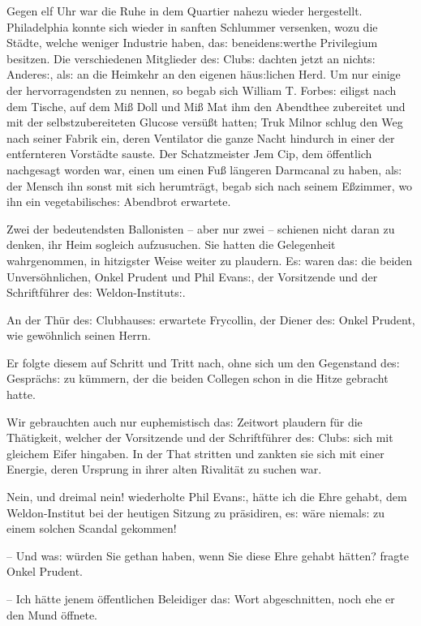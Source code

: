 \documentclass[oneside,12pt]{book}
\newcommand{\s}{s:}
\begin{document}
Gegen elf Uhr war die Ruhe in dem Quartier nahezu wieder hergestellt.
Philadelphia konnte sich wieder in sanften Schlummer versenken, wozu
die St\"adte, welche weniger Industrie haben, da{\s}
beneiden{\s}werthe Privilegium besitzen. Die verschiedenen Mitglieder
de{\s} Club{\s} dachten jetzt an nicht{\s} Andere{\s}, al{\s} an die
Heimkehr an den eigenen h\"au{\s}lichen Herd. Um nur einige der
hervorragendsten zu nennen, so begab sich William T. Forbe{\s}
eiligst nach dem Tische, auf dem Mi{\ss} Doll und Mi{\ss} Mat ihm den
Abendthee zubereitet und mit der selbst\/zubereiteten Glucose
vers\"u{\ss}t hatten; Truk Milnor schlug den Weg nach seiner Fabrik
ein, deren Ventilator die ganze Nacht hindurch in einer der
entfernteren Vorst\"adte sauste. Der Schatzmeister Jem Cip, dem
\"offentlich nachgesagt worden war, einen um einen Fu{\ss} l\"angeren
Darmcanal zu haben, al{\s} der Mensch ihn sonst mit sich
herumtr\"agt, begab sich nach seinem E{\ss}zimmer, wo ihn ein
vegetabilische{\s} Abendbrot erwartete.

Zwei der bedeutendsten Ballonisten -- aber nur zwei -- schienen nicht
daran zu denken, ihr Heim sogleich aufzusuchen. Sie hatten die
Gelegenheit wahrgenommen, in hitzigster Weise weiter zu plaudern.
E{\s} waren da{\s} die beiden Unvers\"ohnlichen, Onkel Prudent und
Phil Evan{\s}, der Vorsitzende und der Schriftf\"uhrer de{\s}
Weldon-Institut{\s}.

An der Th\"ur de{\s} Clubhause{\s} erwartete Frycollin, der Diener
de{\s} Onkel Prudent, wie gew\"ohnlich seinen Herrn.

Er folgte diesem auf Schritt und Tritt nach, ohne sich um den
Gegenstand de{\s} Gespr\"ach{\s} zu k\"ummern, der die beiden
Collegen schon in die Hitze gebracht hatte.

Wir gebrauchten auch nur euphemistisch da{\s} Zeitwort
{\glqq}plaudern{\grqq} f\"ur die Th\"atigkeit, welcher der
Vorsitzende und der Schriftf\"uhrer de{\s} Club{\s} sich mit gleichem
Eifer hingaben. In der That stritten und zankten sie sich mit einer
Energie, deren Ursprung in ihrer alten Rivalit\"at zu suchen war.

{\glqq}Nein, und dreimal nein! wiederholte Phil Evan{\s}, h\"atte ich
die Ehre gehabt, dem Weldon-Institut bei der heutigen Sitzung zu
pr\"asidiren, e{\s} w\"are niemal{\s} zu einem solchen Scandal
gekommen!

-- Und wa{\s} w\"urden Sie gethan haben, wenn Sie diese Ehre gehabt
h\"atten? fragte Onkel Prudent.

-- Ich h\"atte jenem \"offentlichen Beleidiger da{\s} Wort
abgeschnitten, noch ehe er den Mund \"offnete.
\end{document}
